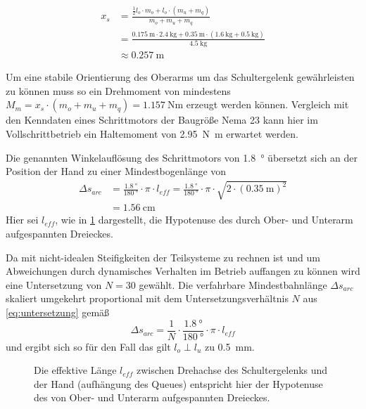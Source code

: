 		\begin{align}
			x_s &= \frac{\frac{1}{2}l_o \cdot m_o + l_o \cdot \left(m_u + m_q\right)}{m_o + m_u + m_q} \nonumber \\
				&= \frac{\SI{0,175}{\metre} \cdot \SI{2,4}{\kilo\gram} + \SI{0,35}{\metre} \cdot \left(\SI{1,6}{\kilo\gram} + \SI{0,5}{\kilo\gram}\right)}{\SI{4,5}{\kilo\gram}} \nonumber \\
				&\approx \SI{0,257}{\metre}%
				\label{eq:massenschwerpunkt arme}
		\end{align}

		Um eine stabile Orientierung des Oberarms um das Schultergelenk gewährleisten zu können muss so ein Drehmoment von mindestens \(M_m = x_s \cdot \left(m_o + m_u + m_q\right) = \SI{1,157}{\newton\metre}\) erzeugt werden können.
		Vergleich mit den Kenndaten eines Schrittmotors der Baugröße Nema 23 \cite{nanotec.specs} kann hier im Vollschrittbetrieb ein Haltemoment von \SI{2,95}{\newton\metre} erwartet werden.\par\medskip
		Die genannten Winkelauflösung des Schrittmotors von \SI{1,8}{\degree} übersetzt sich an der Position der Hand zu einer Mindestbogenlänge von
		\begin{align}
			\Delta s_{arc} 	&= \frac{\SI{1,8}{\degree}}{\SI{180}{\degree}} \cdot \pi \cdot l_{eff} = \frac{\SI{1,8}{\degree}}{\SI{180}{\degree}} \cdot \pi \cdot \sqrt{2 \cdot \left(\SI{0,35}{\metre}\right)^2} \nonumber \\
							&= \SI{1,56}{\cm}
		\end{align}
		Hier sei \(l_{eff}\), wie in \cref{fig:schultergelenk winkelaufloesung} dargestellt, die Hypotenuse des durch Ober- und Unterarm aufgespannten Dreieckes.\par
		Da mit nicht-idealen Steifigkeiten der Teilsysteme zu rechnen ist und um Abweichungen durch dynamisches Verhalten im Betrieb auffangen zu können wird eine Untersetzung von \(N = 30\) gewählt.
		Die verfahrbare Mindestbahnlänge \(\Delta s_{arc}\) skaliert umgekehrt proportional mit dem Untersetzungsverhältnis \(N\) aus \cref{eq:untersetzung} gemäß
		\begin{equation}
			\Delta s_{arc} = \frac{1}{N} \cdot \frac{\SI{1,8}{\degree}}{\SI{180}{\degree}} \cdot \pi \cdot l_{eff}
		\end{equation}
		und ergibt sich so für den Fall das gilt \(l_o \perp l_u\) zu \SI{0,5}{\mm}.
		\begin{figure}[h]
			\centering
			
			\caption[Die effektive Länge \(l_{eff}\) zwischen Drehachse des Schultergelenks und der Hand]{Die effektive Länge \(l_{eff}\) zwischen Drehachse des Schultergelenks und der Hand (aufhängung des Queues) entspricht hier der Hypotenuse des von Ober- und Unterarm aufgespannten Dreieckes.}%
			\label{fig:schultergelenk winkelaufloesung}
		\end{figure}
